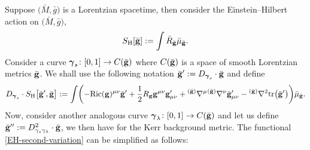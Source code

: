 \documentclass[11pt]{article}
\numberwithin{equation}{section}
\def\mbo#1{\boldsymbol{#1}}%
\def\grad{{\nabla}}%
\newcommand{\leftexp}[2]{{\vphantom{#2}}^{#1}{#2}}
\def\halb{\frac{1}{2}}%
\renewcommand{\gg}{{\bf g}}
\newcommand{\bgg}{{\bar{\bf g}}}
\newcommand{\la}{\lambda}
\numberwithin{equation}{section}
\begin{document}
Suppose $\bigl(\bar{M}, \bar{g}\bigr)$ is a Lorentzian spacetime, then consider the Einstein--Hilbert action on $\bigl(\bar{M}, \bar{g}\bigr)$,
\begin{align*}
S_{\text{H}}[\bar{\gg}] := \int \bar{R}_{\bar{\gg}} \bar{\mu}_{\bar{\gg}}.
\end{align*}
Consider a curve $\mbo{\gamma}_s \colon [0,1] \to C(\bgg)$ where $C(\bgg)$ is a space of smooth Lorentzian metrics $\bgg$. We shall use the following notation $ \bar{\gg}' := D_{\mbo{\gamma}_s} \cdot \bar{\gg}$ and define
\begin{align*}
D_{\mbo{\gamma}_s} \cdot S_{\text{H}} \bigl[\bgg', \bgg\bigr] := \int \biggl( -\text{Ric}(\gg)^{\mu \nu} \bar{\gg}' + \halb R_\gg \gg^{\mu \nu} \gg'_{\mu \nu} + \leftexp{(\bar{\gg})}{\grad}^\mu \leftexp{(\bar{\gg})}{\grad}^\nu \bar{\gg}'_{\mu \nu} - \leftexp{(\bar{\gg})}{\grad}^2 {\rm tr}\bigl(\bgg'\bigr) \biggr) \bar{\mu}_\bgg.
\end{align*}
Now, consider another analogous curve $\mbo{\gamma}_\la \colon [0, 1] \to C (\bgg)$ and let us define $ \bgg'' := D^2_{\gamma_s \gamma_\lambda} \cdot \bgg $, we then have for the Kerr background metric. The functional \eqref{EH-second-variation} can be simplified as follows:
\end{document}
